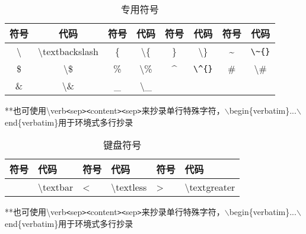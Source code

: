 \documentclass[UTF8,fontset=ubuntu]{ctexart}
\begin{document}
\begin{table}
\begin{tabular}{c c c c c c c c}
	\hline
	符号 & 代码 & 符号 & 代码 & 符号 & 代码 & 符号 & 代码\\
	\hline
	\textbackslash & \textbackslash textbackslash & \{ & \textbackslash\{ & \} & \textbackslash\} & \~{} & \verb|\~{}|\\
	\$ & \textbackslash\$ & \% & \textbackslash\% & \^{} & \verb|\^{}| & \# & \textbackslash\#\\
	\& & \textbackslash\& & \_ & \textbackslash\_\\
	\hline
\end{tabular}\par
\RaggedRight
**也可使用\textbackslash verb\verb'<'sep\verb'>'\verb'<'content\verb'>'\verb'<'sep\verb'>'来抄录单行特殊字符，$\backslash$begin\{verbatim\}...$\backslash$end\{verbatim\}用于环境式多行抄录\\
\caption{专用符号}
\end{table}
\begin{table}
\begin{tabular}{l l l l l l}
	\hline
	符号 & 代码 & 符号 & 代码 & 符号 & 代码\\
	\hline
	\textbar & \textbackslash textbar & \textless & \textbackslash textless & \textgreater & \textbackslash textgreater\\
	\hline
\end{tabular}\par
\RaggedRight
**也可使用\textbackslash verb\verb'<'sep\verb'>'\verb'<'content\verb'>'\verb'<'sep\verb'>'来抄录单行特殊字符，$\backslash$begin\{verbatim\}...$\backslash$end\{verbatim\}用于环境式多行抄录\\
\caption{键盘符号}
\end{table}
\end{document}
